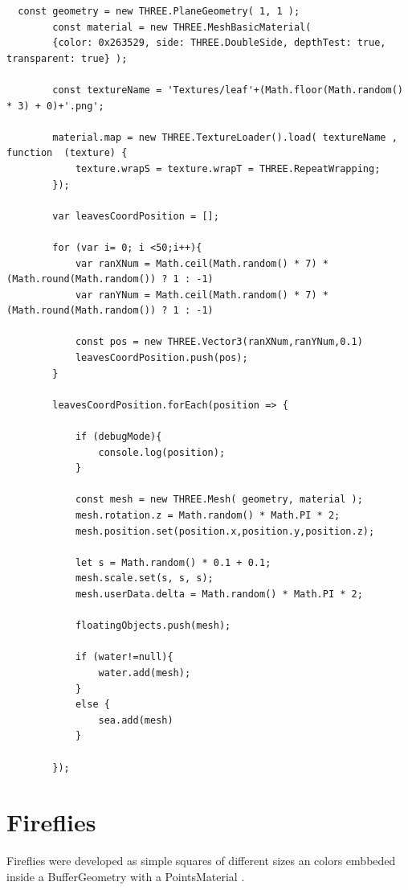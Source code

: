 \documentclass[10pt,a4paper]{article}
\begin{document}
\begin{verbatim}
  const geometry = new THREE.PlaneGeometry( 1, 1 );
        const material = new THREE.MeshBasicMaterial( 
        {color: 0x263529, side: THREE.DoubleSide, depthTest: true, transparent: true} );

        const textureName = 'Textures/leaf'+(Math.floor(Math.random() * 3) + 0)+'.png';

        material.map = new THREE.TextureLoader().load( textureName , function  (texture) {
            texture.wrapS = texture.wrapT = THREE.RepeatWrapping;
        });
        
        var leavesCoordPosition = [];

        for (var i= 0; i <50;i++){
            var ranXNum = Math.ceil(Math.random() * 7) * (Math.round(Math.random()) ? 1 : -1)
            var ranYNum = Math.ceil(Math.random() * 7) * (Math.round(Math.random()) ? 1 : -1)

            const pos = new THREE.Vector3(ranXNum,ranYNum,0.1)
            leavesCoordPosition.push(pos);     
        }
    
        leavesCoordPosition.forEach(position => {

            if (debugMode){
                console.log(position);
            }
       
            const mesh = new THREE.Mesh( geometry, material );
            mesh.rotation.z = Math.random() * Math.PI * 2; 
            mesh.position.set(position.x,position.y,position.z);
          
            let s = Math.random() * 0.1 + 0.1;
            mesh.scale.set(s, s, s);
            mesh.userData.delta = Math.random() * Math.PI * 2;

            floatingObjects.push(mesh);
        
            if (water!=null){
                water.add(mesh);
            }
            else {
                sea.add(mesh)
            }

        });
\end{verbatim}

\section{Fireflies}

Fireflies were developed as simple squares of different sizes an colors embbeded inside a BufferGeometry with a PointsMaterial .
\end{document}
